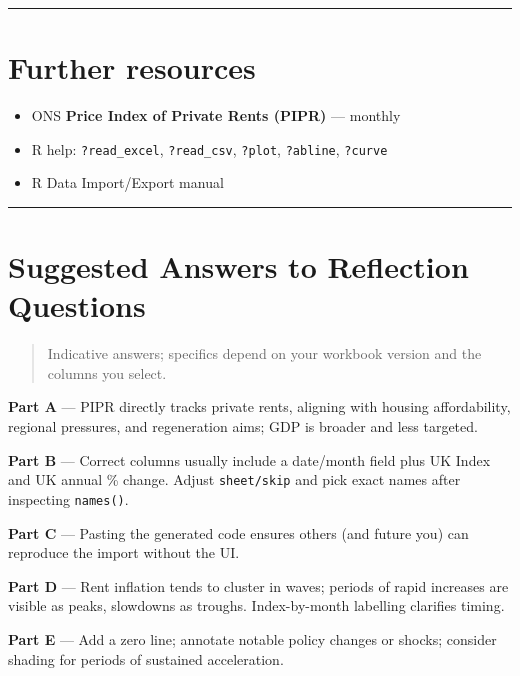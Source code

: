 \documentclass[
  letterpaper,
  DIV=11,
  numbers=noendperiod]{scrreprt}
\providecommand{\tightlist}{%
  \setlength{\itemsep}{0pt}\setlength{\parskip}{0pt}}
\begin{document}
\begin{center}\rule{0.5\linewidth}{0.5pt}\end{center}

\section{Further resources}\label{further-resources}

\begin{itemize}
\tightlist
\item
  ONS \textbf{Price Index of Private Rents (PIPR)} --- monthly
\item
  R help: \texttt{?read\_excel}, \texttt{?read\_csv}, \texttt{?plot},
  \texttt{?abline}, \texttt{?curve}
\item
  R Data Import/Export manual
\end{itemize}

\begin{center}\rule{0.5\linewidth}{0.5pt}\end{center}

\section{Suggested Answers to Reflection
Questions}\label{suggested-answers-to-reflection-questions}

\begin{quote}
Indicative answers; specifics depend on your workbook version and the
columns you select.
\end{quote}

\textbf{Part A} --- PIPR directly tracks private rents, aligning with
housing affordability, regional pressures, and regeneration aims; GDP is
broader and less targeted.

\textbf{Part B} --- Correct columns usually include a date/month field
plus UK Index and UK annual \% change. Adjust \texttt{sheet/skip} and
pick exact names after inspecting \texttt{names()}.

\textbf{Part C} --- Pasting the generated code ensures others (and
future you) can reproduce the import without the UI.

\textbf{Part D} --- Rent inflation tends to cluster in waves; periods of
rapid increases are visible as peaks, slowdowns as troughs.
Index-by-month labelling clarifies timing.

\textbf{Part E} --- Add a zero line; annotate notable policy changes or
shocks; consider shading for periods of sustained acceleration.
\end{document}
